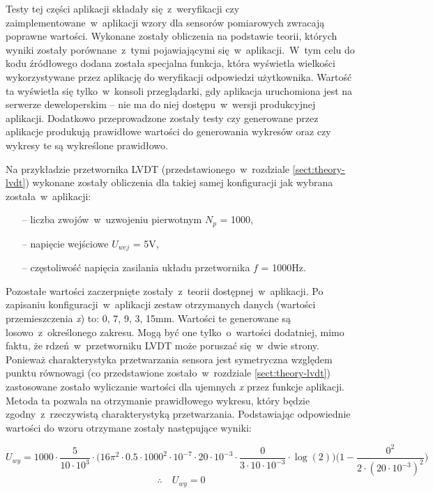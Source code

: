 Testy tej części aplikacji składały się~z~weryfikacji czy zaimplementowane~w~aplikacji wzory dla
sensorów pomiarowych zwracają poprawne wartości. Wykonane zostały obliczenia na podstawie teorii,
których wyniki zostały porównane~z~tymi pojawiającymi się~w~aplikacji.~W~tym celu do kodu źródłowego
dodana została specjalna funkcja, która wyświetla wielkości wykorzystywane przez aplikację do
weryfikacji odpowiedzi użytkownika. Wartość ta wyświetla się tylko~w~konsoli przeglądarki, gdy
aplikacja uruchomiona jest na serwerze deweloperskim -- nie ma do niej dostępu~w~wersji produkcyjnej
aplikacji. Dodatkowo przeprowadzone zostały testy czy generowane przez aplikacje produkują
prawidłowe wartości do generowania wykresów oraz czy wykresy te są wykreślone prawidłowo.

Na przykładzie przetwornika LVDT (przedstawionego~w~rozdziale
\ref{sect:theory-lvdt}) wykonane zostały obliczenia dla takiej samej konfiguracji jak wybrana
została~w~aplikacji:
\begin{itemize}
  \item [--]  liczba zwojów~w~uzwojeniu pierwotnym $N_p$ = 1000,
  \item [--]  napięcie wejściowe $U_{wej}$ = 5V,
  \item [--]  częstoliwość napięcia zasilania układu przetwornika $f$ = 1000Hz.
\end{itemize}
Pozostałe wartości zaczerpnięte zostały~z~teorii dostępnej~w~aplikacji. Po zapisaniu
konfiguracji~w~aplikacji zestaw otrzymanych danych (wartości przemieszczenia \textit{\textrm{x}})
to: 0, 7, 9, 3, 15mm. Wartości te generowane są losowo~z~określonego zakresu. Mogą być one
tylko~o~wartości dodatniej, mimo faktu, że rdzeń~w~przetworniku LVDT może poruszać się~w~dwie
strony. Ponieważ charakterystyka przetwarzania sensora jest symetryczna względem punktu równowagi
(co przedstawione zostało~w~rozdziale \ref{sect:theory-lvdt}) zastosowane zostało wyliczanie
wartości dla ujemnych \textit{\textrm{x}} przez funkcje aplikacji. Metoda ta pozwala na otrzymanie
prawidłowego wykresu, który będzie zgodny~z~rzeczywistą charakterystyką przetwarzania. Podstawiając
odpowiednie wartości do wzoru otrzymane zostały następujące wyniki:

\begin{equation*}
  U_{wy} =1000\cdot \frac{5}{10\cdot 10^3}\cdot\bigg(16\pi^2\cdot 0.5\cdot 1000^2\cdot
  10^{-7}\cdot 20\cdot 10^{-3}\cdot\frac{0}{3\cdot 10\cdot 10^{-3}}\cdot\log{(2)}\bigg)
  \bigg(1-\frac{0^2}{2\cdot (20\cdot 10^{-3})^2}\bigg)
\end{equation*}
\begin{equation*}
  \therefore\quad U_{wy} = 0
\end{equation*}

